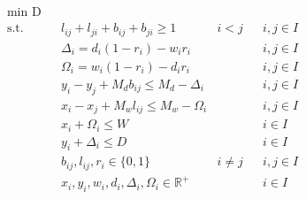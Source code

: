 \begin{align}
	& \underset{}{\text{min D}} \label{equa20}\\
	  & \text{s.t.} &   & l_{ij} + l_{ji} + b_{ij} + b_{ji} \geq 1                              & i < j    &   & i,j \in I \label{equa21} \\
	  &             &   & \Delta_i = d_i (1 - r_i) - w_i r_i                                    &          &   & i,j \in I \label{equa22} \\
	  &             &   & \Omega_i = w_i (1 - r_i) - d_i r_i                                    &          &   & i,j \in I \label{equa23} \\
	  &             &   & y_i - y_j + M_d b_{ij} \leq M_d - \Delta_i                            &          &   & i,j \in I \label{equa24} \\
	  &             &   & x_i - x_j + M_w l_{ij} \leq M_w - \Omega_i                            &          &   & i,j \in I \label{equa25} \\
	  &             &   & x_i + \Omega_i \leq W                                                 &          &   & i \in I   \label{equa26} \\
	  &             &   & y_i + \Delta_i \leq D                                                 &          &   & i \in I   \label{equa27} \\
	  &             &   & b_{ij}, l_{ij}, r_i \in \{0,1\}                                       & i \neq j &   & i,j \in I \label{equa28} \\
	  &             &   & x_{i}, y_{i}, w_{i}, d_{i}, \Delta_{i}, \Omega_{i} \in \mathbb{R}^{+} &          &   & i \in I  \label{equa29}  
\end{align}

